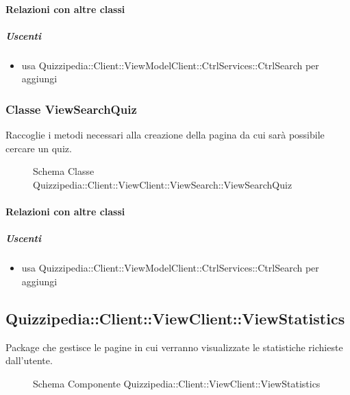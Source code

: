 \paragraph{Relazioni con altre classi}
\subparagraph{Uscenti}
\begin{itemize}
\item usa Quizzipedia::Client::ViewModelClient::CtrlServices::CtrlSearch per aggiungi
\end{itemize}
\subsubsection{Classe ViewSearchQuiz}
Raccoglie i metodi necessari alla creazione della pagina da cui sarà possibile cercare un quiz.
\begin{figure}[H]
\centering
\noindent{}
\caption[Schema Classe ViewSearchQuiz]{Schema Classe Quizzipedia::Client::ViewClient::ViewSearch::ViewSearchQuiz}
\end{figure}
\paragraph{Relazioni con altre classi}
\subparagraph{Uscenti}
\begin{itemize}
\item usa Quizzipedia::Client::ViewModelClient::CtrlServices::CtrlSearch per aggiungi
\end{itemize}
\subsection{Quizzipedia::Client::ViewClient::ViewStatistics}
Package che gestisce le pagine in cui verranno visualizzate le statistiche richieste dall'utente.
\begin{figure}[H]
\centering
\noindent{}
\caption[Schema Componente Quizzipedia::Client::ViewClient::ViewStatistics]{Schema Componente Quizzipedia::Client::ViewClient::ViewStatistics}
\end{figure}

